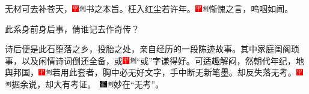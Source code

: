 无材可去补苍天，{\includegraphics[width=3mm]{../Images/00002}\includegraphics[width=3mm]{../Images/00011}\footnotesize \kaishu 书之本旨。}枉入红尘若许年。{\includegraphics[width=3mm]{../Images/00002}\includegraphics[width=3mm]{../Images/00011}\footnotesize \kaishu 惭愧之言，呜咽如闻。}

此系身前身后事，倩谁记去作奇传？

诗后便是此石堕落之乡，投胎之处，亲自经历的一段陈迹故事。其中家庭闺阁琐事，以及闲情诗词倒还全备，或{\includegraphics[width=3mm]{../Images/00002}\includegraphics[width=3mm]{../Images/00011}\footnotesize \kaishu ``或''字谦得好。}可适趣解闷，然朝代年纪，地舆邦国，{\includegraphics[width=3mm]{../Images/00002}\includegraphics[width=3mm]{../Images/00011}\footnotesize \kaishu 若用此套者，胸中必无好文字，手中断无新笔墨。}却反失落无考。{{\includegraphics[width=3mm]{../Images/00002}\includegraphics[width=3mm]{../Images/00011}\footnotesize \kaishu 据余说，却大有考证。　}\includegraphics[width=3mm]{../Images/00006}\includegraphics[width=3mm]{../Images/00011}\footnotesize \kaishu 妙在``无考''。}

